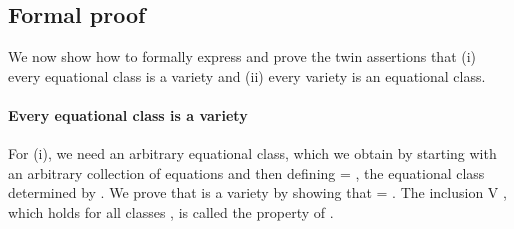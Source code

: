 \subsection{Formal proof}
We now show how to formally express and prove the twin assertions that
(i) every equational class is a variety and (ii) every variety is an equational class.

\paragraph*{Every equational class is a variety}
For (i), we need an arbitrary equational class, which we obtain by starting with an arbitrary
collection  of equations and then defining  =  , the equational class
determined by . We prove that  is a variety by showing that
 =  . The inclusion   \af V , which holds for all
classes , is called the  property of .

